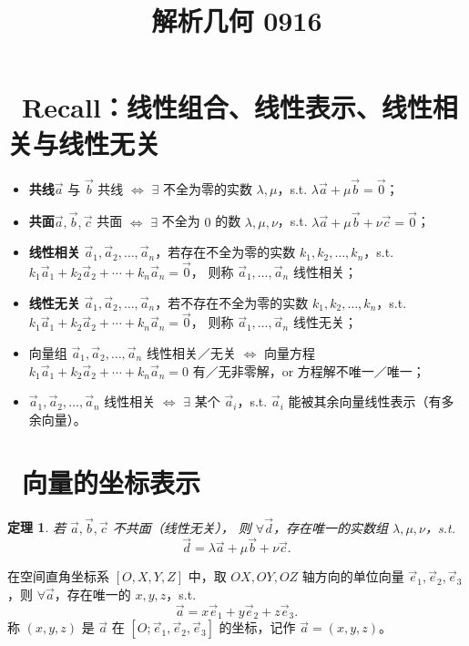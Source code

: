 \documentclass[UTF8,11pt]{ctexart}
\title{解析几何 0916}
\date{}
\theoremstyle{cnthm}
\newtheorem{thm}{定理}[section]
\begin{document}
\maketitle

\section{\ Recall：线性组合、线性表示、线性相关与线性无关}

\begin{itemize}
\item \textbf{共线}\quad $\vec a$ 与 $\vec b$ 共线
$\Longleftrightarrow$ $\exists$ 不全为零的实数
$\lambda,\mu$，s.t.
$\lambda\vec a+\mu\vec b=\vec 0$；
\item \textbf{共面}\quad $\vec a,\vec b,\vec c$ 共面
$\Longleftrightarrow$ $\exists$ 不全为 $0$ 的数
$\lambda,\mu,\nu$，s.t.
$\lambda\vec a+\mu\vec b+\nu\vec c=\vec 0$；
\item \textbf{线性相关}\quad
$\vec a_1,\vec a_2,\ldots,\vec a_n$，若存在不全为零的实数
$k_1,k_2,\ldots,k_n$，s.t.
$k_1\vec a_1+k_2\vec a_2+\cdots+k_n\vec a_n=\vec 0$，
则称 $\vec a_1,\ldots,\vec a_n$ 线性相关；
\item \textbf{线性无关}\quad
$\vec a_1,\vec a_2,\ldots,\vec a_n$，若不存在不全为零的实数
$k_1,k_2,\ldots,k_n$，s.t.
$k_1\vec a_1+k_2\vec a_2+\cdots+k_n\vec a_n=\vec 0$，
则称 $\vec a_1,\ldots,\vec a_n$ 线性无关；
\item 向量组 $\vec a_1,\vec a_2,\ldots,\vec a_n$ 线性相关／无关
$\Longleftrightarrow$ 向量方程
$k_1\vec a_1+k_2\vec a_2+\cdots+k_n\vec a_n=0$
有／无非零解，or 方程解不唯一／唯一；
\item $\vec a_1,\vec a_2,\ldots,\vec a_n$ 线性相关
$\Longleftrightarrow$ $\exists$ 某个 $\vec a_i$，s.t.
$\vec a_i$ 能被其余向量线性表示（有多余向量）。
\end{itemize}

\section{\ 向量的坐标表示}

\begin{thm}
若 $\vec a,\vec b,\vec c$ 不共面（线性无关），
则 $\forall\vec d$，存在唯一的实数组 $\lambda,\mu,\nu$，s.t.
\[
\vec d=\lambda\vec a+\mu\vec b+\nu\vec c .
\]
\end{thm}

在空间直角坐标系 $[O,X,Y,Z]$ 中，取 $OX,OY,OZ$ 轴方向的单位向量
$\vec e_1,\vec e_2,\vec e_3$，则 $\forall\vec a$，存在唯一的
$x,y,z$，s.t.
\[
\vec a=x\vec e_1+y\vec e_2+z\vec e_3 .
\]
称 $(x,y,z)$ 是 $\vec a$ 在
$[O;\vec e_1,\vec e_2,\vec e_3]$ 的坐标，记作
$\vec a=(x,y,z)$。
\end{document}
